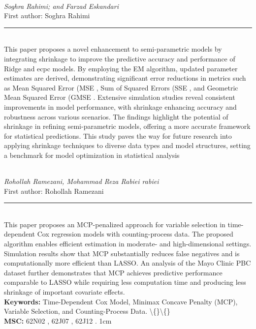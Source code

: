 \documentclass[10pt,twoside]{article}
\begin{document}
\noindent\begin{minipage}[t][\textheight]{\textwidth}
\\[0.35em]
{\itshape Soghra Rahimi; and Farzad Eskandari}\\[0.2em]
{\footnotesize First author: Soghra Rahimi}\\[0.45em]
\noindent\rule{\textwidth}{0.3pt}\\[0.4em]
{\footnotesize This paper proposes a novel enhancement to semi-parametric models by integrating shrinkage to improve the predictive accuracy and performance of Ridge and ecpc models. By employing the EM algorithm, updated parameter estimates are derived, demonstrating significant error reductions in metrics such as Mean Squared Error (MSE , Sum of Squared Errors (SSE , and Geometric Mean Squared Error (GMSE . Extensive simulation studies reveal consistent improvements in model performance, with shrinkage enhancing accuracy and robustness across various scenarios. The findings highlight the potential of shrinkage in refining semi-parametric models, offering a more accurate framework for statistical predictions. This study paves the way for future research into applying shrinkage techniques to diverse data types and model structures, setting a benchmark for model optimization in statistical analysis}\\[0.4em]
\vfill
\end{minipage}
\newpage

\noindent\begin{minipage}[t][\textheight]{\textwidth}
\\[0.35em]
{\itshape Rohollah Ramezani, Mohammad Reza Rabiei rabiei}\\[0.2em]
{\footnotesize First author: Rohollah Ramezani}\\[0.45em]
\noindent\rule{\textwidth}{0.3pt}\\[0.4em]
{\footnotesize  This paper proposes an MCP-penalized approach for variable selection in time-dependent Cox regression models with counting-process data. The proposed algorithm enables efficient estimation in moderate- and high-dimensional settings. Simulation results show that MCP substantially reduces false negatives and is computationally more efficient than LASSO. An analysis of the Mayo Clinic PBC dataset further demonstrates that MCP achieves predictive performance comparable to LASSO while requiring less computation time and producing less shrinkage of important covariate effects.}\\[0.4em]
{\footnotesize\bfseries Keywords:} {\footnotesize Time-Dependent Cox Model, Minimax Concave Penalty (MCP), Variable Selection, and Counting-Process Data. \textbackslash\{\}\textbackslash\{\}}\\[0.15em]
{\footnotesize\bfseries MSC:} {\footnotesize 62N02 , 62J07 , 62J12 . 1cm}\\
\vfill
\end{minipage}
\newpage
\end{document}

